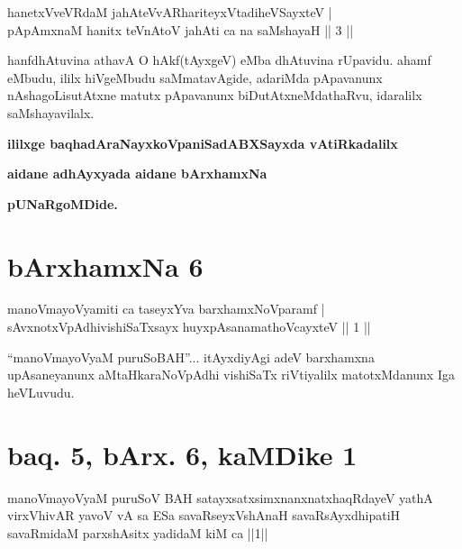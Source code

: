 
\begin{shl}
hanetxVveVRdaM jahAteVvAR\s hariteyxVtadiheVSayxteV | \\
pApAmxnaM hanitx teVnAtoV jahAti ca na saMshayaH \hfill ||  3 || 
\end{shl}

\begin{artha}
hanfdhAtuvina athavA O hAkf(tAyxgeV) eMba dhAtuvina rUpavidu. ahamf eMbudu, ililx hiVgeMbudu saMmatavAgide, adariMda pApavanunx nAshagoLisutAtxne matutx pApavanunx biDutAtxneMdathaRvu, idaralilx saMshayavilalx.
\end{artha}

\begin{center}
{\bf ililxge baqhadAraNayxkoVpaniSadABXSayxda vAtiRkadalilx}
\smallskip

{\bf aidane adhAyxyada aidane bArxhamxNa}
\smallskip

{\bf pUNaRgoMDide.}
\end{center}

\section*{bArxhamxNa 6}

\begin{shl}
manoVmayoV\s yamiti ca taseyxYva barxhamxNoV\s paramf | \\
sAvxnotxVpAdhivishiSaTxsayx huyxpAsanamathoVcayxteV \hfill ||  1 || 
\end{shl}

\begin{artha}
``manoVmayoV\s yaM puruSoBAH''... itAyxdiyAgi adeV barxhamxna upAsaneyanunx aMtaHkaraNoVpAdhi vishiSaTx riVtiyalilx matotxMdanunx Iga heVLuvudu.
\end{artha}

\section*{baq. 5, bArx. 6, kaMDike 1}

\begin{shl}
manoVmayoV\s yaM puruSoV BAH satayxsatxsimxnanxnatxhaqRdayeV yathA virxVhivAR yavoV vA sa ESa savaRseyxVshAnaH savaRsAyxdhipatiH savaRmidaM parxshAsitx yadidaM kiM ca ||1||
\end{shl}


